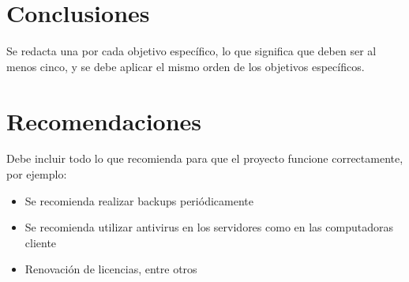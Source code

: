 \section*{Conclusiones}\label{conclusiones}

Se redacta una por cada objetivo específico, lo que significa que deben
ser al menos cinco, y se debe aplicar el mismo orden de los objetivos
específicos.

\newpage

\section*{Recomendaciones}\label{recomendaciones}

Debe incluir todo lo que recomienda para que el proyecto funcione
correctamente, por ejemplo:

\begin{itemize}
\item
  Se recomienda realizar backups periódicamente
\item
  Se recomienda utilizar antivirus en los servidores como en las
  computadoras cliente
\item
  Renovación de licencias, entre otros
\end{itemize}
